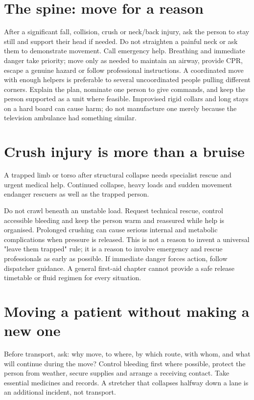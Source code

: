 \documentclass[10pt,openright]{book}
\begin{document}
\section*{The spine: move for a reason}
After a significant fall, collision, crush or neck/back injury, ask the person to stay still and support their head if needed. Do not straighten a painful neck or ask them to demonstrate movement. Call emergency help. Breathing and immediate danger take priority; move only as needed to maintain an airway, provide CPR, escape a genuine hazard or follow professional instructions. A coordinated move with enough helpers is preferable to several uncoordinated people pulling different corners. Explain the plan, nominate one person to give commands, and keep the person supported as a unit where feasible. Improvised rigid collars and long stays on a hard board can cause harm; do not manufacture one merely because the television ambulance had something similar.

\section*{Crush injury is more than a bruise}
A trapped limb or torso after structural collapse needs specialist rescue and urgent medical help. Continued collapse, heavy loads and sudden movement endanger rescuers as well as the trapped person.

Do not crawl beneath an unstable load. Request technical rescue, control accessible bleeding and keep the person warm and reassured while help is organised. Prolonged crushing can cause serious internal and metabolic complications when pressure is released. This is not a reason to invent a universal "leave them trapped" rule; it is a reason to involve emergency and rescue professionals as early as possible. If immediate danger forces action, follow dispatcher guidance. A general first-aid chapter cannot provide a safe release timetable or fluid regimen for every situation.

\section*{Moving a patient without making a new one}
Before transport, ask: why move, to where, by which route, with whom, and what will continue during the move? Control bleeding first where possible, protect the person from weather, secure supplies and arrange a receiving contact. Take essential medicines and records. A stretcher that collapses halfway down a lane is an additional incident, not transport.
\end{document}

